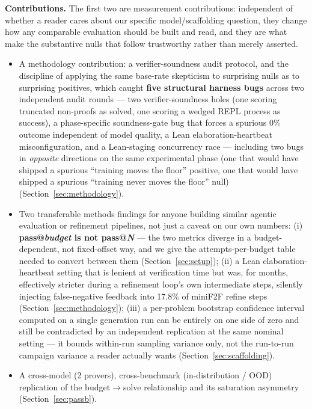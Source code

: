 \documentclass{article}
\begin{document}
\textbf{Contributions.} The first two are measurement contributions: independent of whether a reader
cares about our specific model/scaffolding question, they change how any comparable evaluation should be
built and read, and they are what make the substantive nulls that follow trustworthy rather than merely
asserted.
\begin{itemize}
  \item A methodology contribution: a verifier-soundness audit protocol, and the discipline of applying
    the same base-rate skepticism to surprising nulls as to surprising positives, which caught \textbf{five
    structural harness bugs} across two independent audit rounds --- two verifier-soundness holes (one
    scoring truncated non-proofs as solved, one scoring a wedged REPL process as success), a
    phase-specific soundness-gate bug that forces a spurious 0\% outcome independent of model quality, a
    Lean elaboration-heartbeat misconfiguration, and a Lean-staging concurrency race --- including two
    bugs in \emph{opposite} directions on the same experimental phase (one that would have shipped a
    spurious ``training moves the floor'' positive, one that would have shipped a spurious ``training
    never moves the floor'' null) (Section~\ref{sec:methodology}).
  \item Two transferable methods findings for anyone building similar agentic evaluation or refinement
    pipelines, not just a caveat on our own numbers: (i) \textbf{pass@\emph{budget} is not
    pass@\emph{N}} --- the two metrics diverge in a budget-dependent, not fixed-offset way, and we give
    the attempts-per-budget table needed to convert between them (Section~\ref{sec:setup}); (ii) a Lean
    elaboration-heartbeat setting that is lenient at verification time but was, for months, effectively
    stricter during a refinement loop's own intermediate steps, silently injecting false-negative
    feedback into 17.8\% of miniF2F refine steps (Section~\ref{sec:methodology}); (iii) a per-problem
    bootstrap confidence interval computed on a single generation run can be entirely on one side of
    zero and still be contradicted by an independent replication at the same nominal setting --- it
    bounds within-run sampling variance only, not the run-to-run campaign variance a reader actually
    wants (Section~\ref{sec:scaffolding}).
  \item A cross-model (2 provers), cross-benchmark (in-distribution / OOD) replication of the
    budget$\to$solve relationship and its saturation asymmetry (Section~\ref{sec:passb}).

\end{itemize}
\end{document}
